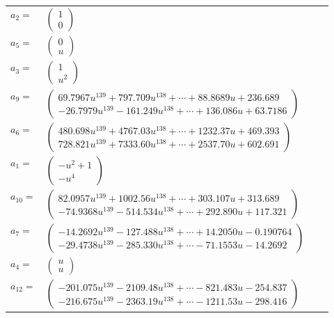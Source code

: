 \documentclass[1p]{elsarticle_modified}
\theoremstyle{definition}
\begin{document}
\begin{tabular}{m{7pt} m{180pt} m{7pt} m{180pt} }
\flushright $a_{2}=$&$\begin{pmatrix}1\\0\end{pmatrix}$ \\
\flushright $a_{5}=$&$\begin{pmatrix}0\\u\end{pmatrix}$ \\
\flushright $a_{3}=$&$\begin{pmatrix}1\\u^2\end{pmatrix}$ \\
\flushright $a_{9}=$&$\begin{pmatrix}69.7967 u^{139}+797.709 u^{138}+\cdots+88.8689 u+236.689\\-26.7979 u^{139}-161.249 u^{138}+\cdots+136.086 u+63.7186\end{pmatrix}$ \\
\flushright $a_{6}=$&$\begin{pmatrix}480.698 u^{139}+4767.03 u^{138}+\cdots+1232.37 u+469.393\\728.821 u^{139}+7333.60 u^{138}+\cdots+2537.70 u+602.691\end{pmatrix}$ \\
\flushright $a_{1}=$&$\begin{pmatrix}- u^2+1\\- u^4\end{pmatrix}$ \\
\flushright $a_{10}=$&$\begin{pmatrix}82.0957 u^{139}+1002.56 u^{138}+\cdots+303.107 u+313.689\\-74.9368 u^{139}-514.534 u^{138}+\cdots+292.890 u+117.321\end{pmatrix}$ \\
\flushright $a_{7}=$&$\begin{pmatrix}-14.2692 u^{139}-127.488 u^{138}+\cdots+14.2050 u-0.190764\\-29.4738 u^{139}-285.330 u^{138}+\cdots-71.1553 u-14.2692\end{pmatrix}$ \\
\flushright $a_{4}=$&$\begin{pmatrix}u\\u\end{pmatrix}$ \\
\flushright $a_{12}=$&$\begin{pmatrix}-201.075 u^{139}-2109.48 u^{138}+\cdots-821.483 u-254.837\\-216.675 u^{139}-2363.19 u^{138}+\cdots-1211.53 u-298.416\end{pmatrix}$ \\

\end{tabular}
\end{document}
